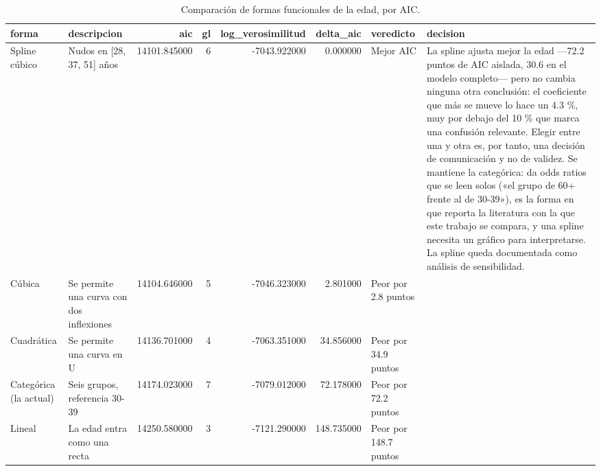 \begin{table}[htbp]
\caption{Comparación de formas funcionales de la edad, por AIC.}
\label{tab:tabla_54_forma_funcional_edad}
\begin{tabular}{llrrrrll}
\toprule
forma & descripcion & aic & gl & log\_verosimilitud & delta\_aic & veredicto & decision \\
\midrule
Spline cúbico & Nudos en [28, 37, 51] años & 14101.845000 & 6 & -7043.922000 & 0.000000 & Mejor AIC & La spline ajusta mejor la edad —72.2 puntos de AIC aislada, 30.6 en el modelo completo— pero no cambia ninguna otra conclusión: el coeficiente que más se mueve lo hace un 4.3 \%, muy por debajo del 10 \% que marca una confusión relevante. Elegir entre una y otra es, por tanto, una decisión de comunicación y no de validez. Se mantiene la categórica: da odds ratios que se leen solos («el grupo de 60+ frente al de 30-39»), es la forma en que reporta la literatura con la que este trabajo se compara, y una spline necesita un gráfico para interpretarse. La spline queda documentada como análisis de sensibilidad. \\
Cúbica & Se permite una curva con dos inflexiones & 14104.646000 & 5 & -7046.323000 & 2.801000 & Peor por 2.8 puntos &  \\
Cuadrática & Se permite una curva en U & 14136.701000 & 4 & -7063.351000 & 34.856000 & Peor por 34.9 puntos &  \\
Categórica (la actual) & Seis grupos, referencia 30-39 & 14174.023000 & 7 & -7079.012000 & 72.178000 & Peor por 72.2 puntos &  \\
Lineal & La edad entra como una recta & 14250.580000 & 3 & -7121.290000 & 148.735000 & Peor por 148.7 puntos &  \\
\bottomrule
\end{tabular}
\end{table}

